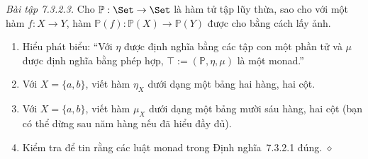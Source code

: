 \noindent\textit{Bài tập 7.3.2.3.}\keepwithnext
Cho $\mathbb P:\Set\to\Set$ là hàm tử tập lũy thừa, sao cho với một hàm $f:X\to Y$, hàm $\mathbb P(f):\mathbb P(X)\to\mathbb P(Y)$ được cho bằng cách lấy ảnh.
\begin{enumerate}[label=\alph*.]
\item Hiểu phát biểu: ``Với $\eta$ được định nghĩa bằng các tập con một phần tử và $\mu$ được định nghĩa bằng phép hợp, $\top:=(\mathbb P,\eta,\mu)$ là một monad.''
\item Với $X=\{a,b\}$, viết hàm $\eta_X$ dưới dạng một bảng hai hàng, hai cột.
\item Với $X=\{a,b\}$, viết hàm $\mu_X$ dưới dạng một bảng mười sáu hàng, hai cột (bạn có thể dừng sau năm hàng nếu đã hiểu đầy đủ).
\item Kiểm tra để tin rằng các luật monad trong Định nghĩa~7.3.2.1 đúng.
\nobreak\hfill$\diamond$
\end{enumerate}
